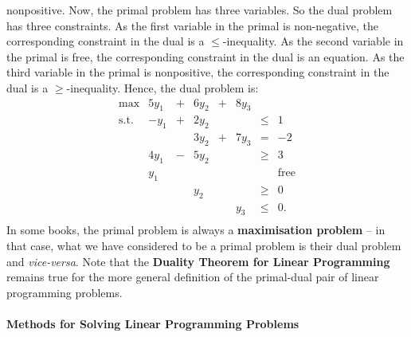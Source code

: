 nonpositive. Now, the primal problem has three variables. So the dual
problem has three constraints. As the first variable in the primal is
non-negative, the corresponding constraint in the dual is a
\(\leq\)-inequality. As the second variable in the primal is free, the
corresponding constraint in the dual is an equation. As the third
variable in the primal is nonpositive, the corresponding constraint in
the dual is a \(\geq\)-inequality. Hence, the dual problem is:
\[\begin{array}{rrcrcrcl}
\max & 5y_1 & + & 6y_2 & + & 8y_3 & \\
\mbox{s.t.} & -y_1 & + & 2y_2 &   &      & \leq &  1 \\
            &      &   & 3y_2 & + & 7y_3 & = & -2 \\
            & 4y_1 & - & 5y_2 &   &      & \geq &  3 \\
            &  y_1 &   &      &   &      &      &  \mbox{free} \\
            &     &    & y_2  &   &      & \geq & 0 \\
            &     &    &      &   & y_3  & \leq & 0.\\
\end{array}\]
In some books, the primal problem is always a \textbf{maximisation problem} -- in that case, what we have considered to be a primal problem is their dual problem and \textit{vice-versa}. Note that the \textbf{Duality Theorem for Linear Programming} remains true for the more general definition of the primal-dual pair of linear programming problems.

\paragraph{Methods for Solving Linear Programming Problems}


